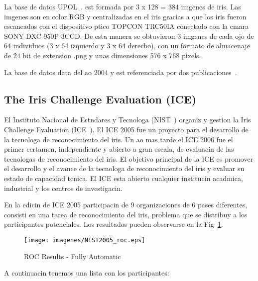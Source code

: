  \label{sec:UPOL_database}

La base de datos UPOL~\cite{database:UPOL}, est formada por 3 x 128 = 384 imgenes de iris. Las imgenes son en color RGB y centralizadas en el iris gracias a que los iris fueron escaneados con el dispositivo ptico TOPCON TRC50IA conectado con la cmara SONY DXC-950P 3CCD. De esta manera se obtuvieron 3 imgenes de cada ojo de 64 individuos (3 x 64 izquierdo y 3 x 64 derecho), con un formato de almacenaje de 24 bit de extension .png y unas dimensiones 576 x 768 pixels.

La base de datos data del ao 2004 y est referenciada por dos publicaciones~\cite{article:Dobes04HumanEyeIris,article:Dobes06HumanEyeHough}.

\newpage

\label{sec:competiciones}

\subsection{The Iris Challenge Evaluation (ICE)}
El Instituto Nacional de Estndares y Tecnologa (NIST~\cite{web:NIST}) organiz y gestion la Iris Challenge Evaluation (ICE~\cite{web:ICE}). El ICE 2005 fue un proyecto para el desarrollo de la tecnologa de reconocimiento del iris. Un ao mas tarde el ICE 2006 fue el primer certamen, independiente y abierto a gran escala, de evaluacin de las tecnologas de reconocimiento del iris. El objetivo principal de la ICE es promover el desarrollo y el avance de la tecnologa de reconocimiento del iris y evaluar su estado de capacidad tcnica. El ICE esta abierto cualquier institucin acadmica, industrial y los centros de investigacin.

En la edicin de ICE 2005 participacin de 9 organizaciones de 6 pases diferentes, consisti en una tarea de reconocimiento del iris, problema que se distribuy a los participantes potenciales. Los resultados pueden observarse en la Fig~\ref{fig:grafica_ice2005}.

\begin{figure}[h]
  \centerline{
    \mbox{\texttt{[image: imagenes/NIST2005\_roc.eps]}}
  }
  \caption{ROC Results - Fully Automatic}
  \label{fig:grafica_ice2005}
\end{figure}

\noindent A continuacin tenemos una lista con los participantes:

